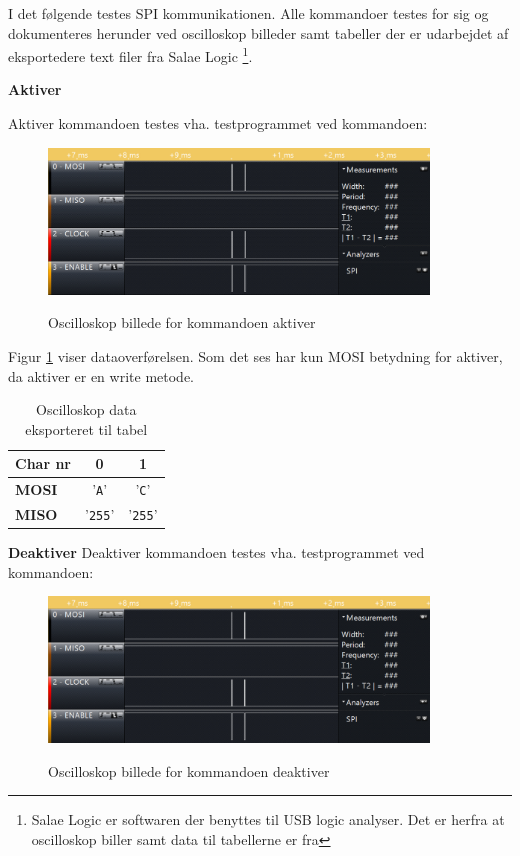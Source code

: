 

I det følgende testes SPI kommunikationen. Alle kommandoer testes for sig og dokumenteres herunder ved oscilloskop billeder samt tabeller der er udarbejdet af eksportedere text filer fra Salae Logic \footnote{Salae Logic er softwaren der benyttes til USB logic analyser. Det er herfra at oscilloskop biller samt data til tabellerne er fra}. 


\textbf{Aktiver}

Aktiver kommandoen testes vha. testprogrammet ved kommandoen: 


\begin{figure}[h]
\centering
{\includegraphics[width=0.90\textwidth]{filer/modultest/Billeder/activate}}
\caption{Oscilloskop billede for kommandoen aktiver}
\label{lab:scop_activate}
\end{figure}

Figur \ref{table:scop_activate} viser dataoverførelsen. Som det ses har kun MOSI betydning for aktiver, da aktiver er en write metode. 

\begin{table}[h]
	\caption{Oscilloskop data eksporteret til tabel}
	\centering
	\begin{tabular}{|l|c|c|}
		\hline 
		\textbf{Char nr} & \textbf{0} & \textbf{1} \\ 		
		\hline 
		\textbf{MOSI} & '\verb+A+' & '\verb+C+' \\ 
		\hline 
		\textbf{MISO} & '\verb+255+' & '\verb+255+' \\ 
		\hline 
	\end{tabular} 
	\label{table:scop_activate}
\end{table}


\textbf{Deaktiver}
Deaktiver kommandoen testes vha. testprogrammet ved kommandoen: 


\begin{figure}[h]
\centering
{\includegraphics[width=0.90\textwidth]{filer/modultest/Billeder/deactivate}}
\caption{Oscilloskop billede for kommandoen deaktiver}
\label{lab:scop_deactivate}
\end{figure}

